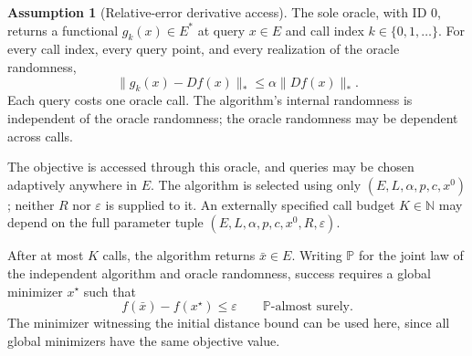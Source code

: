 \documentclass[10pt]{article}
\theoremstyle{definition}
\newtheorem{assumption}{Assumption}
\begin{document}
\begin{assumption}[Relative-error derivative access]
The sole oracle, with ID $0$, returns a functional $g_k(x)\in E^*$ at query $x\in E$ and call index $k\in\{0,1,\ldots\}$. For every call index, every query point, and every realization of the oracle randomness,
\[
\|g_k(x)-Df(x)\|_*\leq\alpha\|Df(x)\|_*.
\]
Each query costs one oracle call. The algorithm's internal randomness is independent of the oracle randomness; the oracle randomness may be dependent across calls.
\end{assumption}

The objective is accessed through this oracle, and queries may be chosen adaptively anywhere in $E$. The algorithm is selected using only $(E,L,\alpha,p,c,x^0)$; neither $R$ nor $\varepsilon$ is supplied to it. An externally specified call budget $K\in\mathbb{N}$ may depend on the full parameter tuple $(E,L,\alpha,p,c,x^0,R,\varepsilon)$.

After at most $K$ calls, the algorithm returns $\bar{x}\in E$. Writing $\mathbb{P}$ for the joint law of the independent algorithm and oracle randomness, success requires a global minimizer $x^\star$ such that
\[
f(\bar{x})-f(x^\star)\leq\varepsilon
\qquad\mathbb{P}\text{-almost surely}.
\]
The minimizer witnessing the initial distance bound can be used here, since all global minimizers have the same objective value.
\end{document}
